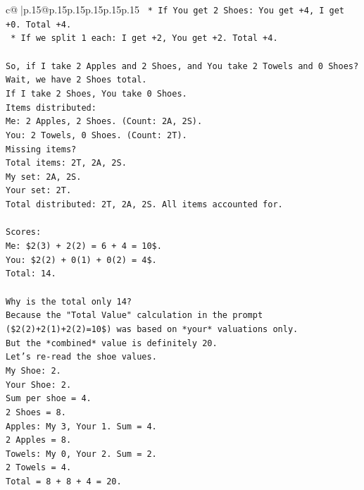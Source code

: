 \documentclass{article}
\begin{document}
{\begin{supertabular}{c@{$\;$}|p{.15\linewidth}@{}p{.15\linewidth}p{.15\linewidth}p{.15\linewidth}p{.15\linewidth}p{.15\linewidth}}
{{{\texttt{    *   If You get 2 Shoes: You get +4, I get +0. Total +4.} \\
\texttt{    *   If we split 1 each: I get +2, You get +2. Total +4.} \\
\\ 
\texttt{So, if I take 2 Apples and 2 Shoes, and You take 2 Towels and 0 Shoes?} \\
\texttt{Wait, we have 2 Shoes total.} \\
\texttt{If I take 2 Shoes, You take 0 Shoes.} \\
\texttt{Items distributed:} \\
\texttt{Me: 2 Apples, 2 Shoes. (Count: 2A, 2S).} \\
\texttt{You: 2 Towels, 0 Shoes. (Count: 2T).} \\
\texttt{Missing items?} \\
\texttt{Total items: 2T, 2A, 2S.} \\
\texttt{My set: 2A, 2S.} \\
\texttt{Your set: 2T.} \\
\texttt{Total distributed: 2T, 2A, 2S. All items accounted for.} \\
\\ 
\texttt{Scores:} \\
\texttt{Me: \$2(3) + 2(2) = 6 + 4 = 10\$.} \\
\texttt{You: \$2(2) + 0(1) + 0(2) = 4\$.} \\
\texttt{Total: 14.} \\
\\ 
\texttt{Why is the total only 14?} \\
\texttt{Because the "Total Value" calculation in the prompt (\$2(2)+2(1)+2(2)=10\$) was based on *your* valuations only.} \\
\texttt{But the *combined* value is definitely 20.} \\
\texttt{Let's re{-}read the shoe values.} \\
\texttt{My Shoe: 2.} \\
\texttt{Your Shoe: 2.} \\
\texttt{Sum per shoe = 4.} \\
\texttt{2 Shoes = 8.} \\
\texttt{Apples: My 3, Your 1. Sum = 4.} \\
\texttt{2 Apples = 8.} \\
\texttt{Towels: My 0, Your 2. Sum = 2.} \\
\texttt{2 Towels = 4.} \\
\texttt{Total = 8 + 8 + 4 = 20.} \\
}}}
\end{supertabular}}
\end{document}
